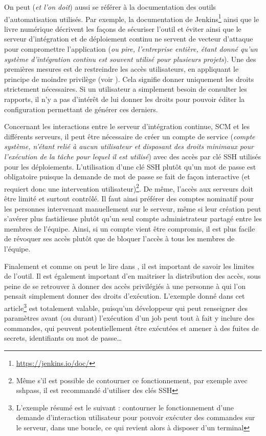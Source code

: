 On peut (\emph{et l'on doit}) aussi se référer à la documentation des outils d'automatisation utilisés. Par exemple, la documentation de Jenkins\footnote{\url{https://jenkins.io/doc/}} ainsi que le livre numérique  \cite[chapitre 7, Sécuriser Jenkins]{jenkins-guide} décrivent les façons de sécuriser l'outil et éviter ainsi que le serveur d'intégration et de déploiement continu ne servent de vecteur d'attaque pour compromettre l'application (\emph{ou pire, l'entreprise entière, étant donné qu'un système d'intégration continu est souvent utilisé pour plusieurs projets}). Une des premières mesures est de restreindre les accès utilisateurs, en appliquant le principe de moindre privilège (voir  \cite{anssi-least-privilege}). Cela signifie donner uniquement les droits strictement nécessaires. Si un utilisateur a simplement besoin de consulter les rapports, il n'y a pas d'intérêt de lui donner les droits pour pouvoir éditer la configuration permettant de générer ces derniers.

Concernant les interactions entre le serveur d'intégration continue, \gls{SCM} et les différents serveurs, il peut être nécessaire de créer un compte de service (\emph{compte système, n'étant relié à aucun utilisateur et disposant des droits minimaux pour l'exécution de la tâche pour lequel il est utilisé}) avec des accès par clé \gls{SSH} utilisés pour les déploiements. L'utilisation d'une clé \gls{SSH} plutôt qu'un mot de passe est obligatoire puisque la demande de mot de passe se fait de façon interactive (et requiert donc une intervention utilisateur)\footnote{Même s'il est possible de contourner ce fonctionnement, par exemple avec sshpass, il est recommandé d'utiliser des clés \gls{SSH}}. De même, l'accès aux serveurs doit être limité et surtout contrôlé. Il faut ainsi préférer des comptes nominatif pour les personnes intervenant manuellement sur le serveur, même si leur création peut s'avérer plus fastidieuse plutôt qu'un seul compte administrateur partagé entre les membres de l'équipe. Ainsi, si un compte vient être compromis, il est plus facile de révoquer ses accès plutôt que de bloquer l'accès à tous les membres de l'équipe.

Finalement et comme on peut le lire dans  \cite{jenkins-security}, il est important de savoir les limites de l'outil. Il est également important d'en maitriser la distribution des accès, sous peine de se retrouver à donner des accès privilégiés à une personne à qui l'on pensait simplement donner des droits d'exécution. L'exemple donné dans cet article\footnote{L'exemple résumé est le suivant : contourner le fonctionnement d'une demande d'interaction utilisateur pour pouvoir exécuter des commandes sur le serveur, dans une boucle, ce qui revient alors à disposer d'un terminal} est totalement valable, puisqu'un développeur qui peut renseigner des paramètres avant (ou durant) l'exécution d'un job peut tout à fait y inclure des commandes, qui peuvent potentiellement être exécutées et amener à des fuites de secrets, identifiants ou mot de passe\ldots{} 


